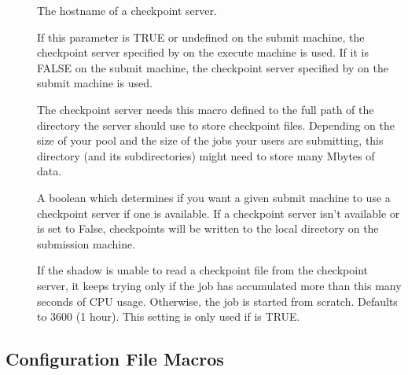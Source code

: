 \begin{description}
  
\item[] \label{param:CkptServerHost} The
  hostname of a checkpoint server.

\item[]
  \label{param:StarterChoosesCkptServer} If this parameter is TRUE 
  or undefined on
  the submit machine, the checkpoint server specified by
   on the execute machine is used.  If it is
  FALSE on the submit machine, the checkpoint server
  specified by  on the submit machine is
  used.
  
\item[] \label{param:CkptServerDir} The
  checkpoint server needs this macro defined to the full path of the
  directory the server should use to store checkpoint files.
  Depending on the size of your pool and the size of the jobs your
  users are submitting, this directory (and its subdirectories) might
  need to store many Mbytes of data.

\item[] \label{param:UseCkptServer} A boolean
  which determines if you want a given submit machine to use a
  checkpoint server if one is available.  If a
  checkpoint server isn't available or  is set to
  False, checkpoints will be written to the local  directory on
  the submission machine.

\item[]
  \label{param:MaxDiscardedRunTime} If the shadow is unable to read a
  checkpoint file from the checkpoint server, it keeps trying only if
  the job has accumulated more than this many seconds of CPU usage.
  Otherwise, the job is started from scratch.  Defaults to 3600 (1
  hour). This setting is only used if  is
  TRUE.

\end{description}


\subsection{\label{sec:Master-Config-File-Entries} Configuration File Macros} 

